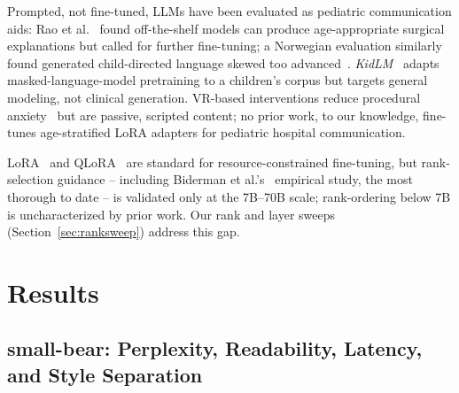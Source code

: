 \documentclass[pdflatex,sn-mathphys-num]{sn-jnl-official}%
\begin{document}
Prompted, not fine-tuned, LLMs have been evaluated as pediatric communication aids: Rao et al.~\cite{rao2025pediatric} found off-the-shelf models can produce age-appropriate surgical explanations but called for further fine-tuning; a Norwegian evaluation similarly found generated child-directed language skewed too advanced~\cite{hassan2025childconv}. \textit{KidLM}~\cite{nayeem2024kidlm} adapts masked-language-model pretraining to a children's corpus but targets general modeling, not clinical generation. VR-based interventions reduce procedural anxiety~\cite{ryu2021vr} but are passive, scripted content; no prior work, to our knowledge, fine-tunes age-stratified LoRA adapters for pediatric hospital communication.

LoRA~\cite{hu2022lora} and QLoRA~\cite{dettmers2023qlora} are standard for resource-constrained fine-tuning, but rank-selection guidance -- including Biderman et al.'s~\cite{biderman2024lora} empirical study, the most thorough to date -- is validated only at the 7B--70B scale; rank-ordering below 7B is uncharacterized by prior work. Our rank and layer sweeps (Section~\ref{sec:ranksweep}) address this gap.

\section{Results}\label{sec2}

\subsection{small-bear: Perplexity, Readability, Latency, and Style Separation}\label{sec:responsemodel}
\end{document}
